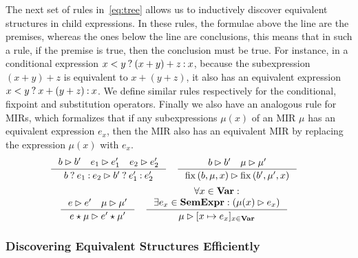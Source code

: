 The next set of rules in~\eqref{eq:tree} allows us to inductively discover
equivalent structures in child expressions.  In these rules, the formulae above
the line are the premises, whereas the ones below the line are conclusions,
this means that in such a rule, if the premise is true, then the conclusion
must be true.  For instance, in a conditional expression $x < y\mathbin{?}(x
+ y) + z\mathbin{:} x$, because the subexpression $(x + y) + z$ is equivalent to $x
+ (y + z)$, it also has an equivalent expression $x < y\mathbin{?} x + (y +
z)\mathbin{:} x$.  We define similar rules respectively for the conditional, fixpoint
and substitution operators.  Finally we also have an analogous rule for MIRs,
which formalizes that if any subexpressions $\mu(x)$ of an MIR $\mu$ has
an equivalent expression $e_x$, then the MIR also has an equivalent MIR by
replacing the expression $\mu(x)$ with $e_x$.
\begin{equation}
    \begin{aligned}
        \inference{%
            b \eqrel b^\prime \quad
            e_1 \eqrel e^\prime_1 \quad
            e_2 \eqrel e^\prime_2
        }{%
            \select{b}{e_1}{e_2} \eqrel
            \select{b^\prime}{e^\prime_1}{e^\prime_2}
        }
        & \quad
        \inference{%
            b \eqrel b^\prime \quad
            \mu \eqrel \mu^\prime
        }{%
            \fixpoint{b, \mu, x} \eqrel \fixpoint{b^\prime, \mu^\prime, x}
        }
    \end{aligned}
    \nonumber
\end{equation}
\vspace{-10pt}
\begin{equation}
    \begin{aligned}
        \inference{%
            e \eqrel e^\prime \quad
            \mu \eqrel \mu^\prime
        }{%
            e \expand \mu \eqrel e^\prime \expand \mu^\prime
        }
        & \quad
        \inference{%
            \forall x \in \varset: \\
            \exists e_x \in \sexprset:
            \left( \mu(x) \eqrel e_x \right)
        }{%
            \mu \eqrel [x \mapsto e_x]_{x \in \varset}
        }
    \end{aligned}
    \label{eq:tree}
\end{equation}

\subsubsection{Discovering Equivalent Structures Efficiently}

